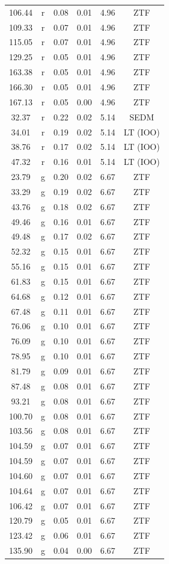 \documentclass{nature_plusfigure}
\begin{document}
\begin{methods}
\begin{longtable}{|c|c|c|c|c|c|}
106.44&r&0.08&0.01&4.96&ZTF\\%
109.33&r&0.07&0.01&4.96&ZTF\\%
115.05&r&0.07&0.01&4.96&ZTF\\%
129.25&r&0.05&0.01&4.96&ZTF\\%
163.38&r&0.05&0.01&4.96&ZTF\\%
166.30&r&0.05&0.01&4.96&ZTF\\%
167.13&r&0.05&0.00&4.96&ZTF\\%
32.37&r&0.22&0.02&5.14&SEDM\\%
34.01&r&0.19&0.02&5.14&LT (IOO)\\%
38.76&r&0.17&0.02&5.14&LT (IOO)\\%
47.32&r&0.16&0.01&5.14&LT (IOO)\\%
23.79&g&0.20&0.02&6.67&ZTF\\%
33.29&g&0.19&0.02&6.67&ZTF\\%
43.76&g&0.18&0.02&6.67&ZTF\\%
49.46&g&0.16&0.01&6.67&ZTF\\%
49.48&g&0.17&0.02&6.67&ZTF\\%
52.32&g&0.15&0.01&6.67&ZTF\\%
55.16&g&0.15&0.01&6.67&ZTF\\%
61.83&g&0.15&0.01&6.67&ZTF\\%
64.68&g&0.12&0.01&6.67&ZTF\\%
67.48&g&0.11&0.01&6.67&ZTF\\%
76.06&g&0.10&0.01&6.67&ZTF\\%
76.09&g&0.10&0.01&6.67&ZTF\\%
78.95&g&0.10&0.01&6.67&ZTF\\%
81.79&g&0.09&0.01&6.67&ZTF\\%
87.48&g&0.08&0.01&6.67&ZTF\\%
93.21&g&0.08&0.01&6.67&ZTF\\%
100.70&g&0.08&0.01&6.67&ZTF\\%
103.56&g&0.08&0.01&6.67&ZTF\\%
104.59&g&0.07&0.01&6.67&ZTF\\%
104.59&g&0.07&0.01&6.67&ZTF\\%
104.60&g&0.07&0.01&6.67&ZTF\\%
104.64&g&0.07&0.01&6.67&ZTF\\%
106.42&g&0.07&0.01&6.67&ZTF\\%
120.79&g&0.05&0.01&6.67&ZTF\\%
123.42&g&0.06&0.01&6.67&ZTF\\%
135.90&g&0.04&0.00&6.67&ZTF\\%

\end{longtable}
\end{methods}
\end{document}
